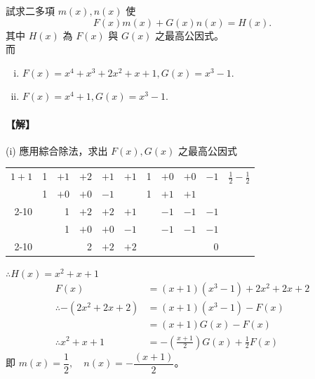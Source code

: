 \begin{example}\label{ex:7-1-7}
試求二多項 $m(x), n(x)$ 使
\begin{equation*}
  F(x)m(x)+G(x)n(x) = H(x).
\end{equation*}
其中 $H(x)$ 為 $F(x)$ 與 $G(x)$ 之最高公因式。\\
而
\begin{enumerate}[(i)]
  \item $F(x) = x^4+x^3+2x^2+x+1, G(x) = x^3-1$.
  \item $F(x) = x^4+1, G(x) = x^3-1$.
\end{enumerate}

\paragraph{【解】}
(i) 應用綜合除法，求出 $F(x), G(x)$ 之最高公因式
\begin{center}
\renewcommand{\arraystretch}{1.2}
\begin{tabular}{r|rrrrr|rrrr|l}
$1+1$ & 1 & $+1$ & $+2$ & $+1$ & $+1$ & 1 & $+0$ & $+0$ & $-1$ & $\frac{1}{2} - \frac{1}{2}$ \\
      & 1 & $+0$ & $+0$ & $-1$ &      & 1 & $+1$ & $+1$ &      & \\ \cline{2-10}
      &   & 1    & $+2$ & $+2$ & $+1$ &   & $-1$ & $-1$ & $-1$ & \\
      &   & 1    & $+0$ & $+0$ & $-1$ &   & $-1$ & $-1$ & $-1$ & \\ \cline{2-10}
      &   &      & 2    & $+2$ & $+2$ &   &      &      & 0    &
\end{tabular}
\end{center}
$\therefore H(x) = x^2+x+1$\\
\begin{align*}
  F(x) &= (x+1)(x^3-1) + 2x^2+2x+2 \\
  \therefore -(2x^2+2x+2) &= (x+1)(x^3-1) - F(x) \\
  &= (x+1)G(x) - F(x) \\
  \therefore x^2+x+1 &= -\left(\frac{x+1}{2}\right)G(x) + \frac{1}{2}F(x)
\end{align*}
即 $m(x) = \dfrac{1}{2}, \quad n(x) = -\dfrac{(x+1)}{2}$。


\end{example}
